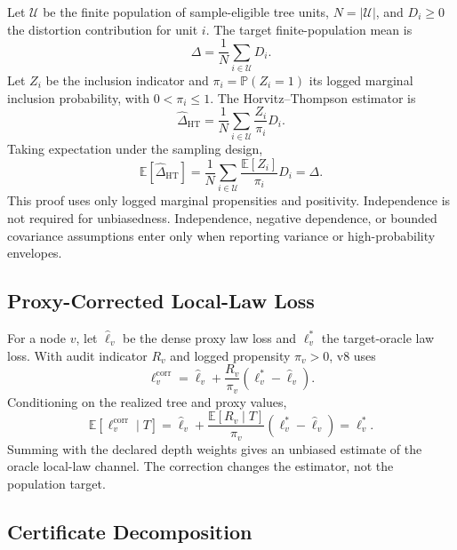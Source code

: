 Let \(\mathcal U\) be the finite population of sample-eligible tree units,
\(N=|\mathcal U|\), and \(D_i\ge 0\) the distortion contribution for unit
\(i\). The target finite-population mean is
\[
  \Delta=\frac{1}{N}\sum_{i\in\mathcal U}D_i .
\]
Let \(Z_i\) be the inclusion indicator and
\(\pi_i=\mathbb P(Z_i=1)\) its logged marginal inclusion probability, with
\(0<\pi_i\le 1\). The Horvitz--Thompson estimator is
\[
  \widehat{\Delta}_{\mathrm{HT}}
  =
  \frac{1}{N}\sum_{i\in\mathcal U}\frac{Z_i}{\pi_i}D_i .
\]
Taking expectation under the sampling design,
\[
  \mathbb E[\widehat{\Delta}_{\mathrm{HT}}]
  =
  \frac{1}{N}\sum_{i\in\mathcal U}
  \frac{\mathbb E[Z_i]}{\pi_i}D_i
  =
  \Delta .
\]
This proof uses only logged marginal propensities and positivity. Independence
is not required for unbiasedness. Independence, negative dependence, or
bounded covariance assumptions enter only when reporting variance or
high-probability envelopes.

\subsection{Proxy-Corrected Local-Law Loss}

For a node \(v\), let \(\widehat \ell_v\) be the dense proxy law loss and
\(\ell_v^\ast\) the target-oracle law loss. With audit indicator \(R_v\) and
logged propensity \(\pi_v>0\), v8 uses
\[
  \ell_v^{\mathrm{corr}}
  =
  \widehat\ell_v
  +
  \frac{R_v}{\pi_v}
  (\ell_v^\ast-\widehat\ell_v).
\]
Conditioning on the realized tree and proxy values,
\[
\mathbb E[\ell_v^{\mathrm{corr}}\mid T]
=
\widehat\ell_v
+
\frac{\mathbb E[R_v\mid T]}{\pi_v}
(\ell_v^\ast-\widehat\ell_v)
=
\ell_v^\ast .
\]
Summing with the declared depth weights gives an unbiased estimate of the
oracle local-law channel. The correction changes the estimator, not the
population target.

\subsection{Certificate Decomposition}


